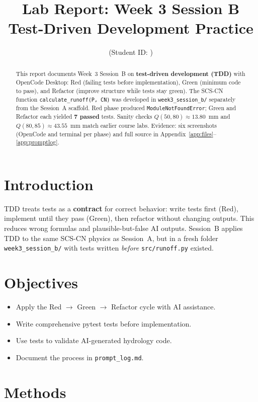 \documentclass[11pt,a4paper]{article}
\title{Lab Report: Week 3 Session B\\Test-Driven Development Practice}
\author{\studentname \quad (Student ID: \studentid)}
\date{\reportdate}
\begin{document}
\maketitle

\begin{abstract}
This report documents Week~3 Session~B on \textbf{test-driven development (TDD)} with OpenCode Desktop: Red (failing tests before implementation), Green (minimum code to pass), and Refactor (improve structure while tests stay green). The SCS-CN function \texttt{calculate\_runoff(P, CN)} was developed in \texttt{week3\_session\_b/} separately from the Session~A scaffold. Red phase produced \texttt{ModuleNotFoundError}; Green and Refactor each yielded \textbf{7 passed} tests. Sanity checks $Q(50,80)\approx 13.80$~mm and $Q(80,85)\approx 43.55$~mm match earlier course labs. Evidence: six screenshots (OpenCode and terminal per phase) and full source in Appendix~\ref{app:files}--\ref{app:promptlog}.
\end{abstract}

\section{Introduction}
TDD treats tests as a \textbf{contract} for correct behavior: write tests first (Red), implement until they pass (Green), then refactor without changing outputs. This reduces wrong formulas and plausible-but-false AI outputs. Session~B applies TDD to the same SCS-CN physics as Session~A, but in a fresh folder \texttt{week3\_session\_b/} with tests written \emph{before} \texttt{src/runoff.py} existed.

\section{Objectives}
\begin{itemize}[noitemsep]
  \item Apply the Red $\rightarrow$ Green $\rightarrow$ Refactor cycle with AI assistance.
  \item Write comprehensive pytest tests before implementation.
  \item Use tests to validate AI-generated hydrology code.
  \item Document the process in \texttt{prompt\_log.md}.
\end{itemize}

\section{Methods}
\end{document}
